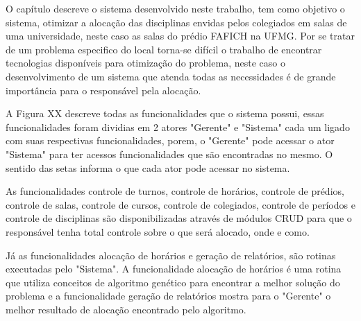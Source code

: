 \documentclass{abntpuc}
\begin{document}
%
%
%
%
%


\iniciocapitulo
O capítulo descreve o sistema desenvolvido neste trabalho, tem como objetivo o sistema, otimizar a alocação das disciplinas envidas pelos colegiados em salas de uma universidade, neste caso as salas do prédio FAFICH na UFMG. Por se tratar de um problema especifico do local torna-se difícil o trabalho de encontrar tecnologias disponíveis para otimização do problema, neste caso o desenvolvimento de um sistema que atenda todas as necessidades é de grande importância para o responsável pela alocação.\par



A Figura XX descreve todas as funcionalidades que o sistema possui, essas funcionalidades foram dividias em 2 atores "Gerente" e "Sistema" cada um ligado com suas respectivas funcionalidades, porem, o "Gerente" pode acessar o ator "Sistema" para ter acessos funcionalidades que são encontradas no mesmo. O sentido das setas informa o que cada ator pode acessar no sistema.\par

As funcionalidades controle de turnos, controle de horários, controle de prédios, controle de salas, controle de cursos, controle de colegiados, controle de períodos e controle de disciplinas são disponibilizadas através de módulos CRUD para que o responsável tenha total controle sobre o que será alocado, onde e como.\par

Já as funcionalidades alocação de horários e geração de relatórios, são rotinas executadas pelo "Sistema". A funcionalidade alocação de horários é uma rotina que utiliza conceitos de algoritmo genético para encontrar a melhor solução do problema e a funcionalidade geração de relatórios mostra para o "Gerente" o melhor resultado de alocação encontrado pelo algoritmo.\par
\end{document}
